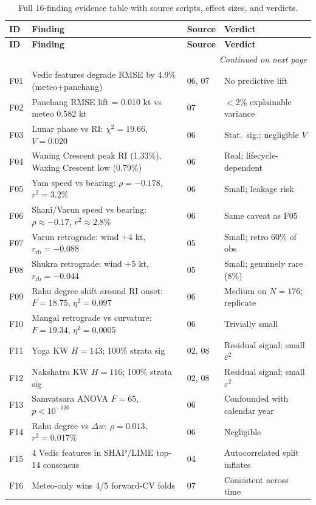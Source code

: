 \documentclass[12pt,a4paper]{article}
\begin{document}
\begin{longtable}{p{2cm}p{5.5cm}lp{4cm}}
  \caption{Full 16-finding evidence table with source scripts, effect sizes,
  and verdicts.}
  \label{tab:evidence_full} \\
  \toprule
  \textbf{ID} & \textbf{Finding} & \textbf{Source} & \textbf{Verdict} \\
  \midrule
  \endfirsthead
  \toprule
  \textbf{ID} & \textbf{Finding} & \textbf{Source} & \textbf{Verdict} \\
  \midrule
  \endhead
  \midrule \multicolumn{4}{r}{\textit{Continued on next page}} \\
  \endfoot
  \bottomrule
  \endlastfoot
  F01 & Vedic features degrade RMSE by 4.9\% (meteo+panchang) & 06, 07 & No predictive lift \\
  F02 & Panchang RMSE lift = 0.010 kt vs meteo 0.582 kt & 07 & $<$2\% explainable variance \\
  F03 & Lunar phase vs RI: $\chi^2=19.66$, $V=0.020$ & 06 & Stat.\ sig.; negligible $V$ \\
  F04 & Waning Crescent peak RI (1.33\%), Waxing Crescent low (0.79\%) & 06 & Real; lifecycle-dependent \\
  F05 & Yam speed vs bearing: $\rho=-0.178$, $r^2=3.2\%$ & 06 & Small; leakage risk \\
  F06 & Shani/Varun speed vs bearing: $\rho\approx-0.17$, $r^2\approx2.8\%$ & 06 & Same caveat as F05 \\
  F07 & Varun retrograde: wind $+4$ kt, $r_\text{rb}=-0.088$ & 05 & Small; retro 60\% of obs \\
  F08 & Shukra retrograde: wind $+5$ kt, $r_\text{rb}=-0.044$ & 05 & Small; genuinely rare (8\%) \\
  F09 & Rahu degree shift around RI onset: $F=18.75$, $\eta^2=0.097$ & 06 & Medium on $N=176$; replicate \\
  F10 & Mangal retrograde vs curvature: $F=19.34$, $\eta^2=0.0005$ & 06 & Trivially small \\
  F11 & Yoga KW $H=143$; 100\% strata sig & 02, 08 & Residual signal; small $\varepsilon^2$ \\
  F12 & Nakshatra KW $H=116$; 100\% strata sig & 02, 08 & Residual signal; small $\varepsilon^2$ \\
  F13 & Samvatsara ANOVA $F=65$, $p<10^{-130}$ & 06 & Confounded with calendar year \\
  F14 & Rahu degree vs $\Delta w$: $\rho=0.013$, $r^2=0.017\%$ & 06 & Negligible \\
  F15 & 4 Vedic features in SHAP/LIME top-14 consensus & 04 & Autocorrelated split inflates \\
  F16 & Meteo-only wins 4/5 forward-CV folds & 07 & Consistent across time \\
\end{longtable}
\end{document}
